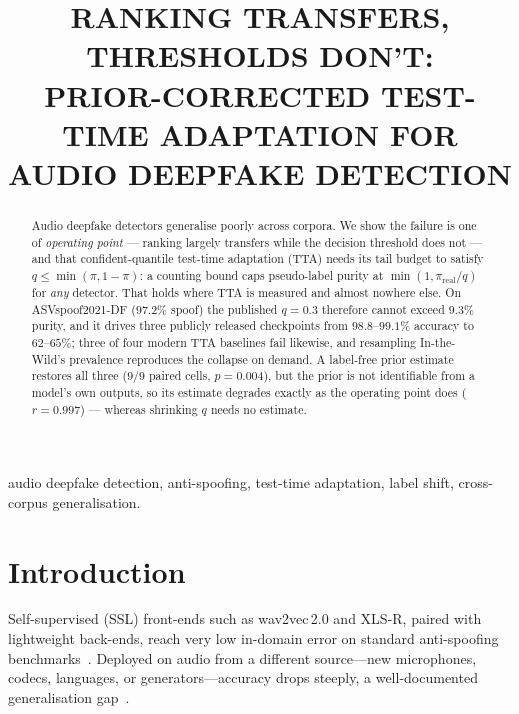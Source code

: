 \documentclass[conference]{IEEEtran}
\begin{document}
\title{RANKING TRANSFERS, THRESHOLDS DON'T:\\
PRIOR-CORRECTED TEST-TIME ADAPTATION FOR AUDIO DEEPFAKE DETECTION}

\author{
\and
{}
\and
{}
}

\maketitle

\begin{abstract}
Audio deepfake detectors generalise poorly across corpora. We show the failure is
one of \emph{operating point} --- ranking largely transfers while the decision
threshold does not --- and that confident-quantile test-time adaptation (TTA)
needs its tail budget to satisfy $q\le\min(\pi,1{-}\pi)$: a counting bound caps
pseudo-label purity at $\min(1,\pi_{\mathrm{real}}/q)$ for \emph{any} detector.
That holds where TTA is measured and almost nowhere else. On ASVspoof2021-DF
($97.2\%$ spoof) the published $q{=}0.3$ therefore cannot exceed $9.3\%$ purity,
and it drives three publicly released checkpoints from $98.8$--$99.1\%$ accuracy
to $62$--$65\%$; three of four modern TTA baselines fail likewise, and resampling
In-the-Wild's prevalence reproduces the collapse on demand. A label-free prior
estimate restores all three ($9/9$ paired cells, $p{=}0.004$), but the prior is
not identifiable from a model's own outputs, so its estimate degrades exactly as
the operating point does ($r{=}0.997$) --- whereas shrinking $q$ needs no estimate.
\end{abstract}

\begin{IEEEkeywords}
audio deepfake detection, anti-spoofing, test-time adaptation, label shift,
cross-corpus generalisation.
\end{IEEEkeywords}

\section{Introduction}
Self-supervised (SSL) front-ends such as wav2vec\,2.0 and XLS-R, paired with
lightweight back-ends, reach very low in-domain error on standard anti-spoofing
benchmarks~\cite{wav2vec2aug,xlsrsls,aasist}. Deployed on audio from a
different source---new microphones, codecs, languages, or generators---accuracy
drops steeply, a well-documented generalisation gap~\cite{asdg,crossdomain,itw}.
\end{document}
